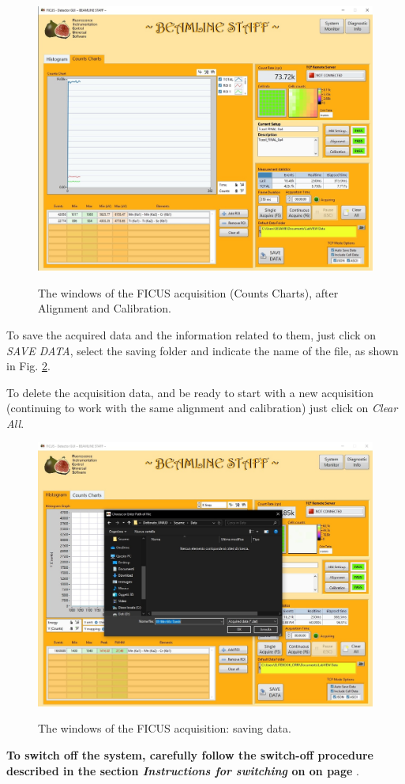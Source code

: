 \documentclass[a4paper,12pt,oneside,pdflatex,italian,final,twocolumn]{article}
\begin{document}
\begin{figure}[h]
\centering
{\includegraphics[width=.8\textwidth]{Capture49.jpg}} \quad
\caption{The windows of the FICUS acquisition (Counts Charts), after Alignment and Calibration.}\label{fig:fig53}
\end{figure}

To save the acquired data and the information related to them, just click on \textit{SAVE DATA}, select the saving folder and indicate the name of the file, as shown in Fig. \ref{fig:fig54}. 

To delete the acquisition data, and be ready to start with a new acquisition (continuing to work with the same alignment and calibration) just click on \textit{Clear All}.

\clearpage
\begin{figure}[h]
\centering
{\includegraphics[width=.7\textwidth]{Cattura99.jpg}} \quad
\caption{The windows of the FICUS acquisition: saving data.}\label{fig:fig54}
\end{figure}

\textbf{To switch off the system, carefully follow the switch-off procedure described in the section \textit{Instructions for switching} on on page \pageref{spegnimento}}. 
\end{document}
